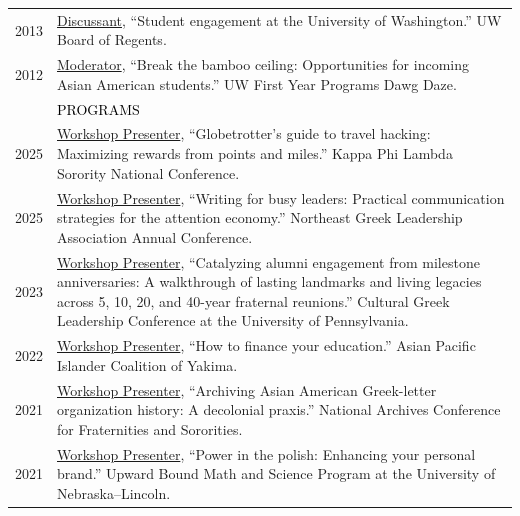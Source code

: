 \documentclass[12pt]{article}
\begin{document}
{\begin{longtable}{R{0.75in}p{5.0in}}
\footnotesize{2013} & \href{https://www.washington.edu/regents/meetings/2013/meeting-minutes-for-2013/minutes-january-10-2013}{Discussant}, ``Student engagement at the University of Washington.'' UW Board of Regents.\\

\footnotesize{2012} & \href{https://www.facebook.com/events/410710345657255/}{Moderator}, ``Break the bamboo ceiling: Opportunities for incoming Asian American students.'' UW First Year Programs Dawg Daze.\medskip \\

& \large \textcolor{black}{\uppercase{Programs}}\\
\footnotesize{2025} &
\href{https://kplsorority.org/}{Workshop Presenter}, ``Globetrotter’s guide to travel hacking: Maximizing rewards from points and miles.'' Kappa Phi Lambda Sorority National Conference.\\

\footnotesize{2025} &
\href{https://www.instagram.com/p/DF_iBenK9ga/}{Workshop Presenter}, ``Writing for busy leaders: Practical communication strategies for the attention economy.'' Northeast Greek Leadership Association Annual Conference.\\

\footnotesize{2023} &
\href{https://www.instagram.com/p/CxiqWamujW2/}{Workshop Presenter}, ``Catalyzing alumni engagement from milestone anniversaries: A walkthrough of lasting landmarks and living legacies across 5, 10, 20, and 40-year fraternal reunions.'' Cultural Greek Leadership Conference at the University of Pennsylvania.\\

\footnotesize{2022} &
\href{https://apicyakima.org/2022/02/22/march-brain-trust-meeting/}{Workshop Presenter}, ``How to finance your education.'' Asian Pacific Islander Coalition of Yakima.\\

\footnotesize{2021} &
\href{https://www.library.illinois.edu/slc/news-events/national-archives-conference/2021-schedule-of-events/}{Workshop Presenter}, ``Archiving Asian American Greek-letter organization history: A decolonial praxis.'' National Archives Conference for Fraternities and Sororities.\\

\footnotesize{2021} &
\href{https://newsroom.unl.edu/announce/trio-ubms/11966/73616}{Workshop Presenter}, ``Power in the polish: Enhancing your personal brand.'' Upward Bound Math and Science Program at the University of Nebraska–Lincoln.\\


\end{longtable}}
\end{document}
